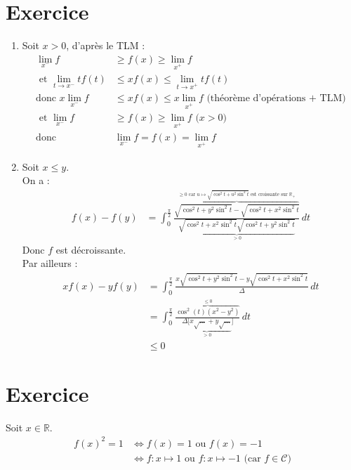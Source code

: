 \documentclass{report}
\begin{document}
\section{Exercice}
\begin{enumerate}
    \item Soit $x > 0$, d'après le TLM : 
    \begin{align*}
        \lim_{x^-} f &\geq f(x) \geq \lim_{x^+} f \\
        \text{ et } \lim_{t\to x^-} tf(t) &\leq xf(x) \leq \lim_{t\to x^+} tf(t) \\
        \text{donc } x \lim_{x^-} f &\leq xf(x) \leq x \lim_{x^+} f \text{ (théorème d'opérations + TLM)} \\
        \text{ et } \lim_{x^-} f &\geq f(x) \geq \lim_{x^+} f \text{ ($x > 0$)} \\
        \text{donc } &\boxed{\lim_{x^-} f = f(x) = \lim_{x^+} f}
    \end{align*}

    \item Soit $x \leq y$. \\
    On a : 
    \begin{align*}
        f(x) - f(y) &= \int_{0}^{\frac{\pi}{2}} \frac{\overbrace{\sqrt{\cos^2 t + y^2 \sin^2 t} - \sqrt{\cos^2 t + x^2 \sin^2 t}}^{\geq 0 \text{ car } u\mapsto \sqrt{\cos^2 t + u^2 \sin^2 t} \text{ est croissante sur } \mathbb{R}_+}}{\underbrace{\sqrt{\cos^2 t + x^2 \sin^2 t} \sqrt{\cos^2 t + y^2 \sin^2 t}}_{> 0}} \,dt
    \end{align*}
    Donc $f$ est décroissante. \\
    Par ailleurs : 
    \begin{align*}
        xf(x) - yf(y) &= \int_{0}^{\frac{\pi}{2}} \frac{x\sqrt{\cos^2 t + y^2 \sin^2 t} - y\sqrt{\cos^2 t + x^2 \sin^2 t}}{\Delta} \,dt \\
        &= \int_{0}^{\frac{\pi}{2}} \frac{\overbrace{\cos^2 (t) (x^2 - y^2)}^{\leq 0}}{\underbrace{\Delta[x\sqrt{\ldots} + y\sqrt{\ldots}}_{> 0}]} \,dt \\
        &\leq 0
    \end{align*}
\end{enumerate}

\setcounter{section}{9}
\section{Exercice}
Soit $x \in \mathbb{R}$. 
\begin{align*}
    f(x)^2 = 1 &\Leftrightarrow f(x) = 1 \text{ ou } f(x) = -1 \\
    &\Leftrightarrow f:x\mapsto 1 \text{ ou } f:x\mapsto -1 \text{ (car $f\in \mathcal{C}$)}
\end{align*}
\end{document}
